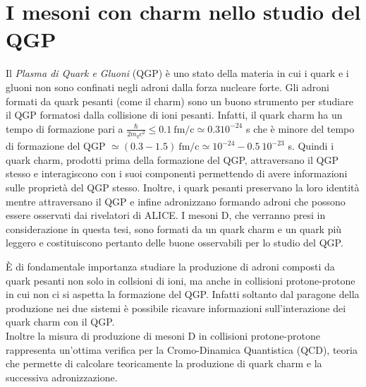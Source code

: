 \section{I mesoni con charm nello studio del QGP}
Il \textit{Plasma di Quark e Gluoni} (QGP) è uno stato della materia in cui i quark e i gluoni non sono confinati negli adroni dalla forza nucleare forte. Gli adroni formati da quark pesanti (come il charm) sono un buono strumento per studiare il QGP formatosi dalla collisione di ioni pesanti. Infatti, il quark charm ha un tempo di formazione pari a $\frac{\hbar}{2m_qc^2} \leq 0.1 \ \mathrm{fm/c} \simeq 0.3 10^{-24}$ s che \`e minore del tempo di formazione del QGP $\simeq (0.3 - 1.5) \ \mathrm{fm/c} \simeq 10^{-24} - 0.5 \ 10^{-23}$ s. Quindi i quark charm, prodotti prima della formazione del QGP, attraversano il QGP stesso e interagiscono con i suoi componenti permettendo di avere informazioni sulle propriet\`a del QGP stesso. Inoltre, i quark pesanti preservano la loro identit\`a mentre attraversano il QGP e infine adronizzano formando adroni che possono essere osservati dai rivelatori di ALICE. I mesoni D, che verranno presi in considerazione in questa tesi, sono formati da un quark charm e un quark pi\`u leggero e costituiscono pertanto delle buone osservabili per lo studio del QGP. 

È di fondamentale importanza studiare la produzione di adroni composti da quark pesanti non solo in collsioni di ioni, ma anche in collisioni protone-protone in cui non ci si aspetta la formazione del QGP.
Infatti soltanto dal paragone della produzione nei due sistemi \`e possibile ricavare informazioni sull'interazione dei quark charm con il QGP. 
\\Inoltre la misura di produzione di mesoni D in collisioni protone-protone rappresenta un'ottima verifica per la Cromo-Dinamica Quantistica (QCD), teoria che permette di calcolare teoricamente la produzione di quark charm e la successiva adronizzazione.

